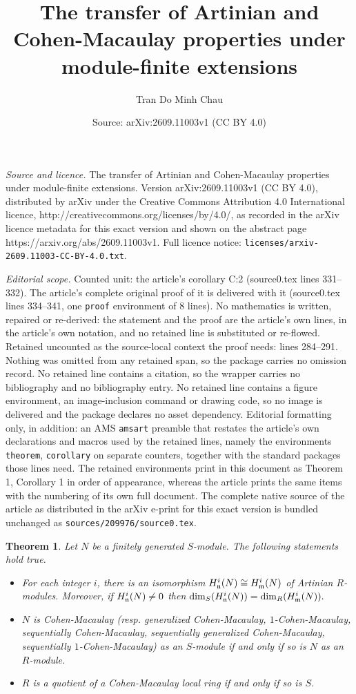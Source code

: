 \documentclass[10pt,a4paper]{amsart}
\title{The transfer of Artinian and Cohen-Macaulay properties under module-finite extensions}
\author{Tran Do Minh Chau}
\date{Source: arXiv:2609.11003v1 (CC BY 4.0)}
\newtheorem{theorem}{Theorem}
\begin{document}
\maketitle

\noindent\emph{Source and licence.} The transfer of Artinian and Cohen-Macaulay properties under module-finite extensions. Version arXiv:2609.11003v1 (CC BY 4.0), distributed by arXiv under the Creative Commons Attribution 4.0 International licence, http://creativecommons.org/licenses/by/4.0/, as recorded in the arXiv licence metadata for this exact version and shown on the abstract page https://arxiv.org/abs/2609.11003v1. Full licence notice: \texttt{licenses/arxiv-2609.11003-CC-BY-4.0.txt}.\par\smallskip

\noindent\textit{Editorial scope.} Counted unit: the article's corollary C:2 (source0.tex lines 331--332). The article's complete original proof of it is delivered with it (source0.tex lines 334--341, one \texttt{proof} environment of 8 lines). No mathematics is written, repaired or re-derived: the statement and the proof are the article's own lines, in the article's own notation, and no retained line is substituted or re-flowed.  Retained uncounted as the source-local context the proof needs: lines 284--291.  Nothing was omitted from any retained span, so the package carries no omission record.  No retained line contains a citation, so the wrapper carries no bibliography and no bibliography entry.  No retained line contains a figure environment, an image-inclusion command or drawing code, so no image is delivered and the package declares no asset dependency.  Editorial formatting only, in addition: an AMS \texttt{amsart} preamble that restates the article's own declarations and macros used by the retained lines, namely the environments \texttt{theorem}, \texttt{corollary} on separate counters, together with the standard packages those lines need.  The retained environments print in this document as Theorem 1, Corollary 1 in order of appearance, whereas the article prints the same items with the numbering of its own full document.  The complete native source of the article as distributed in the arXiv e-print for this exact version is bundled unchanged as \texttt{sources/209976/source0.tex}.
\begin{theorem}\label{T:2} Let $N$ be a finitely generated $S$-module. The following statements hold true. 
\begin{itemize}			
\item [{\rm (a)}] For each integer $i$, there is an isomorphism $H^i_{\frak n}(N)\cong  H^i_{\frak m}(N)$ of Artinian $R$-modules. Moreover, if $H^i_{\frak n}(N)\neq 0$ then  
$\dim_S(H^i_{\frak n}(N))=\dim_R(H^i_{\frak m}(N)).$
\item [{\rm (b)}] $N$ is Cohen-Macaulay (resp. generalized Cohen-Macaulay, $1$-Cohen-Macaulay,  sequentially  Cohen-Macaulay, sequentially  generalized Cohen-Macaulay, sequentially  $1$-Cohen-Macaulay)  as an $S$-module if and only if so is $N$ as an $R$-module.
\item [{\rm (c)}]  $R$ is a quotient of a Cohen-Macaulay local ring if and only if so is  $S$.
\end{itemize} 		
\end{theorem}
\end{document}
